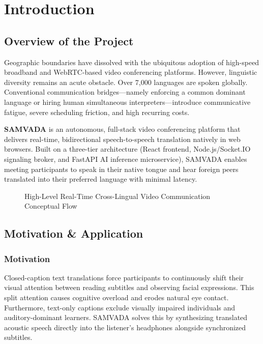 \documentclass[12pt,a4paper]{report}
\begin{document}
\newpage
{}
\setcounter{page}{1}

\chapter{Introduction}

\section{Overview of the Project}
Geographic boundaries have dissolved with the ubiquitous adoption of high-speed broadband and WebRTC-based video conferencing platforms. However, linguistic diversity remains an acute obstacle. Over 7,000 languages are spoken globally. Conventional communication bridges---namely enforcing a common dominant language or hiring human simultaneous interpreters---introduce communicative fatigue, severe scheduling friction, and high recurring costs.

\textbf{SAMVADA} is an autonomous, full-stack video conferencing platform that delivers real-time, bidirectional speech-to-speech translation natively in web browsers. Built on a three-tier architecture (React frontend, Node.js/Socket.IO signaling broker, and FastAPI AI inference microservice), SAMVADA enables meeting participants to speak in their native tongue and hear foreign peers translated into their preferred language with minimal latency.

\begin{figure}[H]
  \centering
  \caption{High-Level Real-Time Cross-Lingual Video Communication Conceptual Flow}
  \label{fig:fig1_1}
\end{figure}

\section{Motivation \& Application}
\subsection{Motivation}
Closed-caption text translations force participants to continuously shift their visual attention between reading subtitles and observing facial expressions. This split attention causes cognitive overload and erodes natural eye contact. Furthermore, text-only captions exclude visually impaired individuals and auditory-dominant learners. SAMVADA solves this by synthesizing translated acoustic speech directly into the listener's headphones alongside synchronized subtitles.
\end{document}
